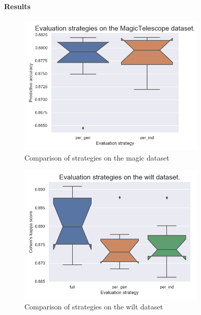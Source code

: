 \paragraph{Results}

\begin{figure}[b!]\centering
\includegraphics[width=0.8\textwidth]{../img/magic-out.png}
\caption{Comparison of strategies on the magic dataset}
\label{pic04:magic}
\end{figure}

\begin{figure}[pt]\centering
\includegraphics[width=0.8\textwidth]{../img/wilt-out.png}
\caption{Comparison of strategies on the wilt dataset}
\label{pic04:wilt}
\end{figure}

